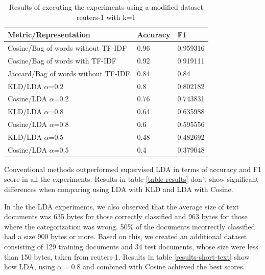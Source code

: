 \documentclass[preprint,12pt,3p]{elsarticle}
\begin{document}
\begin{table}[]
\centering
\caption{Results of executing the experiments using a modified dataset reuters-1 with k=1}
\label{results-modified}
\begin{tabular}{|l|l|l|}
\hline
\textbf{Metric/Representation}      & \textbf{Accuracy} & \textbf{F1} \\ \hline
Cosine/Bag of words without TF-IDF  & 0.96              & 0.959316    \\ \hline
Cosine/Bag of words with TF-IDF     & 0.92              & 0.919111    \\ \hline
Jaccard/Bag of words without TF-IDF & 0.84              & 0.84        \\ \hline
KLD/LDA $\alpha$=0.2                   & 0.8               & 0.802182    \\ \hline
Cosine/LDA $\alpha$=0.2                & 0.76              & 0.743831    \\ \hline
KLD/LDA $\alpha$=0.8                   & 0.64              & 0.635988    \\ \hline
Cosine/LDA $\alpha$=0.8                & 0.6               & 0.595556    \\ \hline
KLD/LDA $\alpha$=0.5                   & 0.48              & 0.482692    \\ \hline
Cosine/LDA $\alpha$=0.5                & 0.4               & 0.379048    \\ \hline
\end{tabular}
\end{table}

Conventional methods outperformed supervised LDA in terms of accuracy and F1 score in all the experiments. Results in table \ref{table-results} don't show significant differences when comparing using LDA with KLD and LDA with Cosine.\par

In the the LDA experiments, we also observed that the average size of text documents was 635 bytes for those correctly classified and 963 bytes for those where the categorization was wrong. 50\% of the documents incorrectly classified had a size 900 bytes or more. Based on this, we created an additional dataset consisting of 129 training documents and 34 test documents, whose size were less than 150 bytes, taken from reuters-1. Results in table \ref{results-short-text} show how LDA, using $\alpha = 0.8$ and combined with Cosine achieved the best scores.\par
\end{document}

